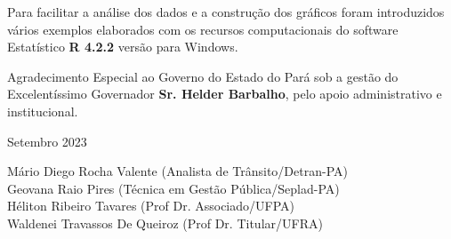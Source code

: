 Para facilitar a análise dos dados e a construção dos gráficos foram introduzidos vários exemplos elaborados com os recursos computacionais do software Estatístico \textbf{R 4.2.2} versão para Windows. 
\vst

Agradecimento Especial ao Governo do Estado do Pará sob a gestão do Excelentíssimo Governador \textbf{Sr. Helder Barbalho}, pelo apoio administrativo e institucional.




\vst

\begin{centering}

\vst

Setembro 2023 
\vsm

Mário Diego Rocha Valente (Analista de Trânsito/Detran-PA) \\
Geovana Raio Pires (Técnica em Gestão Pública/Seplad-PA)\\
Héliton Ribeiro Tavares (Prof Dr. Associado/UFPA)\\
Waldenei Travassos De Queiroz (Prof Dr. Titular/UFRA)\\



\end{centering}
